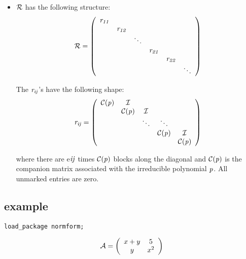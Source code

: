 \begin{itemize}
\item ${\cal R}$ has the following structure:
      \begin{displaymath}
      {\cal R} = \left( \begin{array}{cccccc} {\it r_{11}} \\  & 
      {\it r_{12}} \\  &  & \ddots \\  &  &  & {\it r_{21}}  \\ &  &  
      &  & {\it r_{22}} \\ &  &  &  &  & \ddots \end{array} \right) 
      \end{displaymath}

      The ${\it r_{ij}}$'s have the following shape:  
      \begin{displaymath}
      {\it r_{ij}} = \left( \begin{array}{ccccc} {\cal C}({\it p}) & 
      {\cal I}  &  &  & \\  &  {\cal C}({\it p}) & {\cal I}  & & \\ & 
      & \ddots & \ddots & \\ &  &  &  {\cal C}({\it p}) & {\cal I} \\ &
      &  &  & {\cal C}({\it p}) \end{array} \right) 
      \end{displaymath}

      where there are e${\it ij}$ times ${\cal C}({\it p})$ blocks 
      along the diagonal and ${\cal C}({\it p})$ is the companion 
      matrix  associated with the irreducible polynomial ${\it p}$. All 
      unmarked entries are zero.
\end{itemize}

\subsection{example}

{\tt load\_package normform;}

\begin{displaymath}
{\cal A} = \left( \begin{array}{cc} x+y & 5 \\ y & x^2  \end{array} 
\right)
\end{displaymath}

